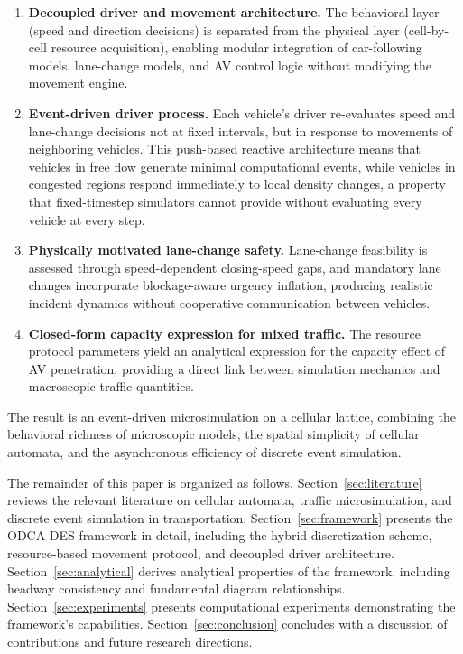 \documentclass[review,authoryear]{elsarticle}
\begin{document}
\begin{enumerate}
    \item \textbf{Decoupled driver and movement architecture.} The behavioral layer (speed and direction decisions) is separated from the physical layer (cell-by-cell resource acquisition), enabling modular integration of car-following models, lane-change models, and AV control logic without modifying the movement engine.

    \item \textbf{Event-driven driver process.} Each vehicle's driver re-evaluates speed and lane-change decisions not at fixed intervals, but in response to movements of neighboring vehicles. This push-based reactive architecture means that vehicles in free flow generate minimal computational events, while vehicles in congested regions respond immediately to local density changes, a property that fixed-timestep simulators cannot provide without evaluating every vehicle at every step.

    \item \textbf{Physically motivated lane-change safety.} Lane-change feasibility is assessed through speed-dependent closing-speed gaps, and mandatory lane changes incorporate blockage-aware urgency inflation, producing realistic incident dynamics without cooperative communication between vehicles.

    \item \textbf{Closed-form capacity expression for mixed traffic.} The resource protocol parameters yield an analytical expression for the capacity effect of AV penetration, providing a direct link between simulation mechanics and macroscopic traffic quantities.
\end{enumerate}

The result is an event-driven microsimulation on a cellular lattice, combining the behavioral richness of microscopic models, the spatial simplicity of cellular automata, and the asynchronous efficiency of discrete event simulation.

The remainder of this paper is organized as follows. Section~\ref{sec:literature} reviews the relevant literature on cellular automata, traffic microsimulation, and discrete event simulation in transportation. Section~\ref{sec:framework} presents the ODCA-DES framework in detail, including the hybrid discretization scheme, resource-based movement protocol, and decoupled driver architecture. Section~\ref{sec:analytical} derives analytical properties of the framework, including headway consistency and fundamental diagram relationships. Section~\ref{sec:experiments} presents computational experiments demonstrating the framework's capabilities. Section~\ref{sec:conclusion} concludes with a discussion of contributions and future research directions.
\end{document}
